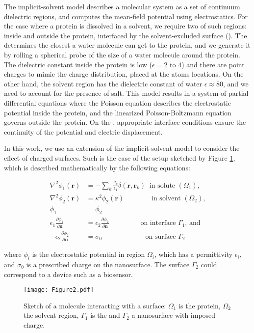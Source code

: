 
The implicit-solvent model describes a molecular system as a set of continuum dielectric regions, and computes the mean-field potential using electrostatics. 
For the case where a protein is dissolved in a solvent, we require two of such regions: inside and outside the protein, interfaced by the solvent-excluded surface (\ses). 
The \ses determines the closest a water molecule can get to the protein, and we generate it by rolling a spherical probe of the size of a water molecule around the protein. 
The dielectric constant inside the protein is low ($\epsilon= 2\text{ to }4$) and there are point charges to mimic the charge distribution, placed at the atoms locations. On the other hand, the solvent region has the dielectric constant of water $\epsilon \approx 80$, and we need to account for the presence of salt. 
This model results in a system of partial differential equations where the Poisson equation describes the electrostatic potential inside the protein, and the linearized Poisson-Boltzmann equation governs outside the protein. On the \ses, appropriate interface conditions ensure the continuity of the potential and electric displacement.

In this work, we use an extension of the implicit-solvent model to consider the effect of charged surfaces. Such is the case of the setup sketched by Figure \ref{fig:molecule_surface}, which is described mathematically by the following equations:


\begin{align} \label{eq:pde}
\nabla^2 \phi_1(\mathbf{r}) &= - \sum_k \frac{q_k}{\epsilon_1} \delta(\mathbf{r},\mathbf{r}_k) \ \text{ in solute $(\Omega_1)$,}  \nonumber \\ 
\nabla^2\phi_2 (\mathbf{r}) &= \kappa^2 \phi_2(\mathbf{r}) \quad \qquad \ \ \ \text{ in solvent $(\Omega_2)$,}  \nonumber \\ 
\phi_1 &=\phi_2 \nonumber \\ 
\epsilon_1 \frac{\partial \phi_1}{\partial \mathbf{n}} &= \epsilon_2 \frac{\partial \phi_2}{\partial \mathbf{n}}  \ \qquad \qquad \text{ on interface $\Gamma_1$, and} \nonumber \\
-\epsilon_2 \frac{\partial \phi_2}{\partial \mathbf{n}} &= \sigma_0 \qquad \qquad \qquad \text{ on surface $\Gamma_2$} 
\end{align}

\noindent where $\phi_i$ is the electrostatic potential in region $\Omega_i$, which has a permittivity $\epsilon_i$, and $\sigma_0$ is a prescribed charge on the nanosurface. The surface $\Gamma_2$ could correspond to a device such as a biosensor.

\begin{figure}
   \texttt{[image: Figure2.pdf]} 
   \caption{Sketch of a molecule interacting with a surface: $\Omega_1$ is the protein, $\Omega_2$ the solvent region, $\Gamma_1$ is the  \ses and $\Gamma_2$ a nanosurface with imposed charge.}
   \label{fig:molecule_surface}
\end{figure}
